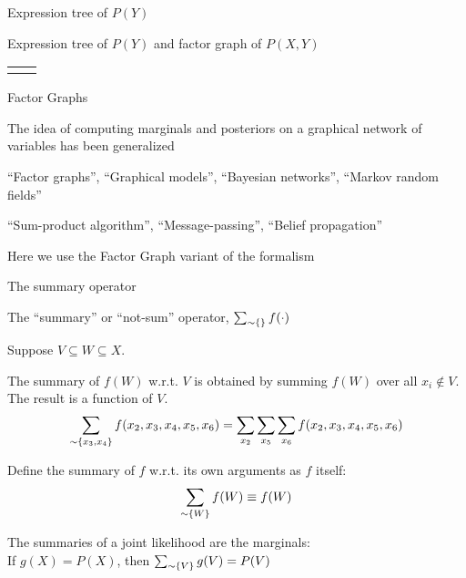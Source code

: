 \documentclass{beamer}
\begin{document}
\begin{frame}{Expression tree of $P(Y)$}

\PYExprTree

\end{frame}


\newcommand\PYandPXY{
\begin{frame}{Expression tree of $P(Y)$ and factor graph of $P(X,Y)$}

\noindent\begin{tabular}{p{.7\textwidth}p{.3\textwidth}}
\makebox{\PYExprTree} & \makebox{\tiny\PXYFactorGraph}
\end{tabular}

\end{frame}
}

\PYandPXY

\begin{frame}{Factor Graphs}
\itemb
 \item The idea of computing marginals and posteriors on a graphical network of variables has been generalized
  \itemb
  \item ``\alert{Factor graphs}'', ``Graphical models'', ``Bayesian networks'', ``Markov random fields''
  \item ``\alert{Sum-product algorithm}'', ``Message-passing'', ``Belief propagation''
  \iteme
 \item Here we use the Factor Graph variant of the formalism
\iteme
\end{frame}

\begin{frame}{The summary operator}
\itemb
 \item The ``summary'' or ``not-sum'' operator, $\sum_{ \sim \{  \} } f(\cdot)$
  \itemb
  \item Suppose $V \subseteq W \subseteq X$.
  \item The \alert{summary of $f(W)$ w.r.t. $V$}
is obtained by summing $f(W)$ over all $x_i \notin V$.
The result is a function of $V$.
\[
\sum_{ \sim \{ x_3,x_4 \} } f(x_2,x_3,x_4,x_5,x_6) = \sum_{x_2} \sum_{x_5} \sum_{x_6} f(x_2,x_3,x_4,x_5,x_6)
\]
  \item Define the summary of $f$ w.r.t. its own arguments as $f$ itself:
\[
\sum_{ \sim \{ W \} }f(W) \equiv f(W)
\]
  \item \alert{The summaries of a joint likelihood are the marginals:} \\ If $g(X)=P(X)$, then $\sum_{ \sim \{ V \} } g(V) = P(V)$
  \iteme
\iteme
\end{frame}
\end{document}
